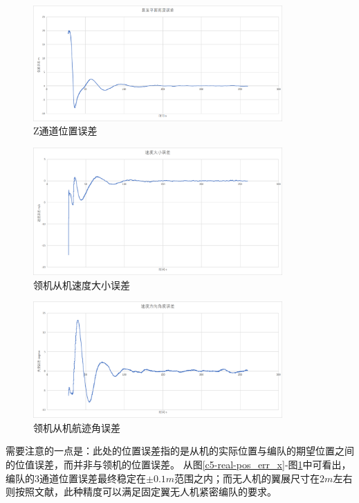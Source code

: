 \begin{figure}[H]
    \centering
    \includegraphics[width=0.85\textwidth]{figures/c5/c5-real-pos_err_z}
    \caption{Z通道位置误差}\label{c5-real-pos_err_z}
\end{figure}
\begin{figure}[H]
    \centering
    \includegraphics[width=0.85\textwidth]{figures/c5/c5-real-vel_err}
    \caption{领机从机速度大小误差}\label{c5-real-vel_err}
\end{figure}
\begin{figure}[H]
    \centering
    \includegraphics[width=0.85\textwidth]{figures/c5/c5-real-eta_err}
    \caption{领机从机航迹角误差}\label{c5-real-eta_err}
\end{figure}
需要注意的一点是：此处的位置误差指的是从机的实际位置与编队的期望位置之间的位值误差，而并非与领机的位置误差。
从图\ref{c5-real-pos_err_x}-图\ref{c5-real-pos_err_z}中可看出，编队的3通道位置误差最终稳定在$\pm0.1m$范围之内；而无人机的翼展尺寸在$2m$左右
则按照文献\cite{Zhang2017Aerodynamics}，此种精度可以满足固定翼无人机紧密编队的要求。

